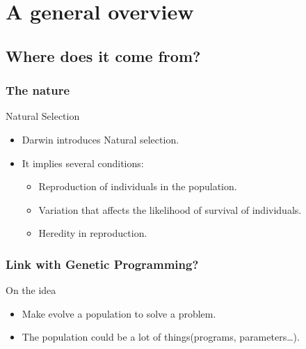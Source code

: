 \section{A general overview}
\subsection{Where does it come from?}

\begin{frame}
  \frametitle{The nature}
  \begin{block}{Natural Selection}
    \begin{itemize}
    \item<1-7> Darwin\cite{darwin.1840.origin.of.species} introduces
      Natural selection.
    \item<2-7> It implies several conditions:
      \begin{itemize}
      \item<3-7> Reproduction of individuals in the population.
      \item<4-7> Variation that affects the likelihood of survival of
        individuals.
      \item<5-7> Heredity in reproduction.
      \end{itemize}
    \end{itemize}
  \end{block}

\end{frame}

\begin{frame}
  \frametitle{Link with Genetic Programming?}
  \begin{block}{On the idea}
    \begin{itemize}[<+->]
    \item Make evolve a population to solve a problem.
    \item The population could be a lot of things(programs, parameters\dots).
    \end{itemize}
  \end{block}

\end{frame}


